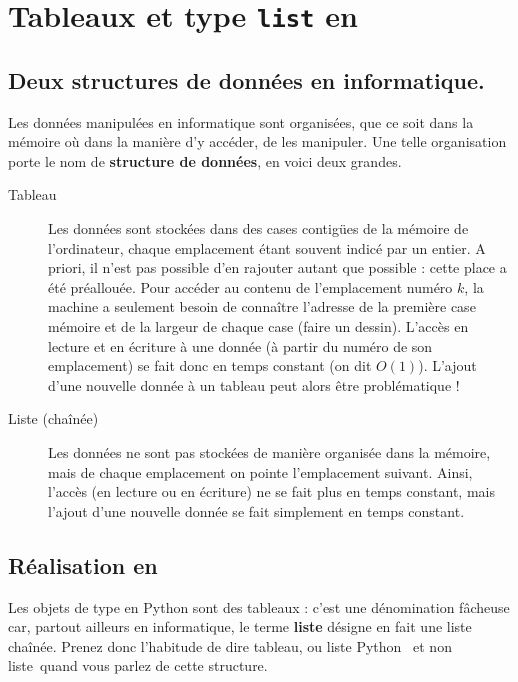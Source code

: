 
\section{Tableaux et type \texttt{list} en \python}

\subsection{Deux structures de données en informatique.}

Les données manipulées en informatique sont organisées, que ce soit dans la mémoire où dans la manière d'y accéder, de les manipuler. 
Une telle organisation porte le nom de \textbf{structure de données}, en voici deux grandes.  

\begin{description}
  \item[Tableau] Les données sont stockées dans des cases contigües de la mémoire de l'ordinateur, chaque emplacement étant souvent indicé par un entier. 
    A priori, il n'est pas possible d'en rajouter autant que possible : cette place a été préallouée. 
    Pour accéder au contenu de l'emplacement numéro $k$, la machine a seulement besoin de connaître 
l'adresse de la première case mémoire et de la largeur de chaque case (faire un dessin). 
    L'accès en lecture et en écriture à une donnée (à partir du numéro de son emplacement) se fait donc en temps constant (on dit $O(1)$).
    L'ajout d'une nouvelle donnée à un tableau peut alors être problématique !
  \item[Liste (chaînée)] Les données ne sont pas stockées de manière organisée dans la mémoire, 
mais de chaque emplacement on pointe l'emplacement suivant. 
    Ainsi, l'accès (en lecture ou en écriture) ne se fait plus en temps constant, mais l'ajout d'une nouvelle donnée se fait simplement en temps constant. 
\end{description}

\subsection{Réalisation en \python}

Les objets de type  en Python sont des tableaux : c'est une 
dénomination fâcheuse car, partout ailleurs en informatique, le terme
\textbf{liste} désigne en fait une liste chaînée. Prenez donc
l'habitude de dire \og tableau\fg, ou \og liste Python \fg\ et non \og liste\fg\ quand vous parlez de cette
structure.

